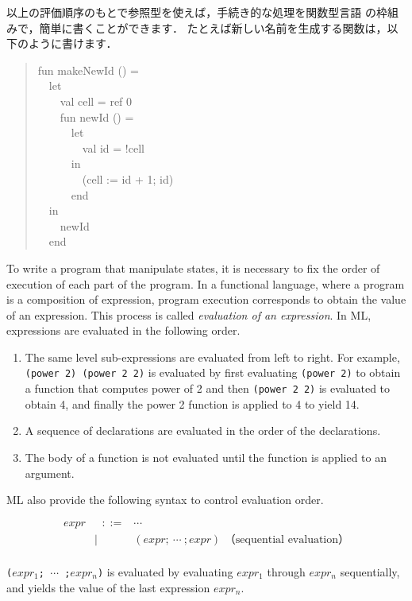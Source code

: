 \documentclass{jbook}
\newcommand{\myem}{\mbox{\ \ }}
\begin{document}
	以上の評価順序のもとで参照型を使えば，手続き的な処理を関数型言語
の枠組みで，簡単に書くことができます．
	たとえば新しい名前を生成する関数は，以下のように書けます．
\begin{tt}
\begin{quote}
fun makeNewId () =\\
\myem let\\
\myem\myem val cell = ref 0\\
\myem\myem fun newId () =\\
\myem\myem\myem let\\
\myem\myem\myem\myem val id = !cell\\
\myem\myem\myem in\\
\myem\myem\myem\myem (cell := id + 1; id)\\
\myem\myem\myem end\\
\myem in\\
\myem\myem newId\\
\myem end
\end{quote}
\end{tt}
\else%
	To write a program that manipulate states, it is necessary to
fix the order of execution of each part of the program.
	In a functional language, where a program is a composition of
expression, program execution corresponds to obtain the value of an
expression.
	This process is called {\em evaluation of an expression}.
	In ML, expressions are evaluated in the following order.
\begin{enumerate}
\item The same level sub-expressions are evaluated from left to right. 
	For example, {\tt (power 2) (power 2 2)} is evaluated by
first evaluating {\tt (power 2)} to obtain a function that computes
power of 2 and then {\tt (power 2 2)} is evaluated to obtain 4, and
finally the power 2 function is applied to 4 to yield 
14.
\item A sequence of declarations are evaluated in the order of the
declarations.
\item The body of a function is not evaluated until the function is
applied to an argument.
\end{enumerate}
	ML also provide the following syntax to control evaluation order.
\begin{tt}
\begin{eqnarray*}
expr &\mbox{\ \ }::=& \cdots\\
     &|& (expr;{\ }\cdots{\ };expr)   \mbox{\ \ \ \ （sequential evaluation）} \\
\end{eqnarray*}
\end{tt}
	{\tt ($expr_1$;{\ }$\cdots${\ };$expr_n$)} is evaluated by 
evaluating $expr_1$ through $expr_n$ sequentially, and yields the value
of the last expression $expr_n$.
\end{document}
